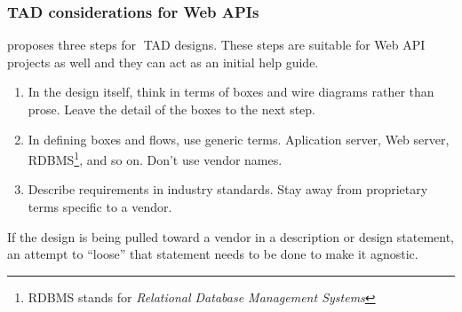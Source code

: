 \documentclass[10pt,article]{IEEEtran}
\begin{document}
\subsubsection{TAD considerations for Web APIs} \cite{artofscalability} proposes three steps for TAD designs. These steps are suitable for Web API projects as well and they can act as an initial help guide.

\begin{enumerate}
    \item
    In the design itself, think in terms of boxes and wire diagrams rather than prose. Leave the detail of the boxes to the next step.
    \item
    In defining boxes and flows, use generic terms. Aplication server, Web server, RDBMS\footnote{RDBMS stands for \textit{Relational Database Management Systems}}, and so on. Don't use vendor names.
    \item
    Describe requirements in industry standards. Stay away from proprietary terms specific to a vendor.  
\end{enumerate}

If the design is being pulled toward a vendor in a description or design statement, an attempt to ``loose'' that statement needs to be done to make it agnostic.


  

 

\end{document}
